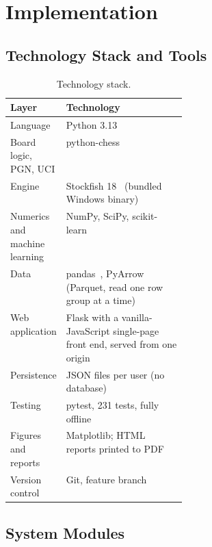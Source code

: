 \chapter{Implementation}\label{ch:implementation}

\section{Technology Stack and Tools}

\begin{table}[H]
\centering
\small
\caption{Technology stack.}\label{tab:stack}
\begin{tabularx}{\linewidth}{p{0.3\linewidth}Y}
\toprule
\textbf{Layer} & \textbf{Technology} \\
\midrule
Language & Python 3.13 \\
Board logic, PGN, UCI & python-chess~\cite{pythonchess} \\
Engine & Stockfish 18~\cite{stockfish} (bundled Windows binary) \\
Numerics and machine learning & NumPy, SciPy, scikit-learn~\cite{pedregosa2011scikit} \\
Data & pandas~\cite{mckinney2010data}, PyArrow (Parquet, read one row group at a time) \\
Web application & Flask with a vanilla-JavaScript single-page front end, served from one origin \\
Persistence & JSON files per user (no database) \\
Testing & pytest, 231 tests, fully offline \\
Figures and reports & Matplotlib; HTML reports printed to PDF \\
Version control & Git, feature branch  \\
\bottomrule
\end{tabularx}
\end{table}

\section{System Modules}

